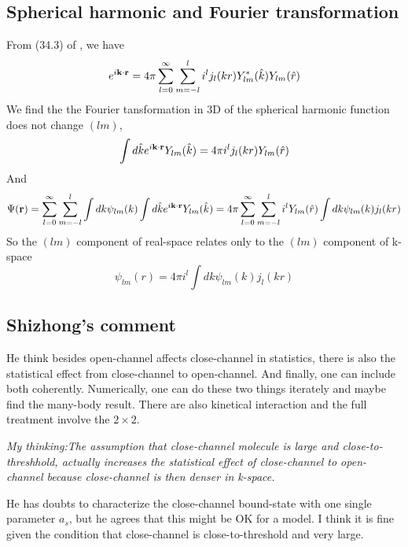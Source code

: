 \subsection{Spherical harmonic and Fourier transformation}
From (34.3) of \cite{landau}, we have
\begin{equation}
e^{i\mathbf{k}\cdot\mathbf{r}}=4\pi\sum_{l=0}^{\infty}\sum_{m=-l}^{l}i^l{}j_l(kr)Y^*_{lm}(\hat{k})Y_{lm}(\hat{r})
\end{equation}
We find the the Fourier tansformation in 3D of the spherical harmonic function does not change $(lm)$,
\begin{equation}
\int{d\hat{k}e^{i\ensuremath{\mathbf{k}}\cdot\ensuremath{\mathbf{r}}}Y_{lm}(\hat{k})}=4\pi{}i^l{}j_l(kr)Y_{lm}(\hat{r})
\end{equation} 
And 
\begin{equation*}
\Psi(\mathbf{r})=\sum_{l=0}^{\infty}\sum_{m=-l}^{l}\int{dk}\psi_{lm}{(k)}\int{d\hat{k}e^{i\ensuremath{\mathbf{k}}\cdot\ensuremath{\mathbf{r}}}Y_{lm}(\hat{k})}=4\pi{}\sum_{l=0}^{\infty}\sum_{m=-l}^{l}i^l{}Y_{lm}(\hat{r})\int{dk}\psi_{lm}{(k)}j_l(kr)
\end{equation*}
So the $(lm)$ component of real-space relates only to the $(lm)$ component of k-space 
\begin{equation}
\psi_{lm}(r)=4\pi{}i^l{}\int{dk}\psi_{lm}{(k)}j_l(kr)
\end{equation}


\subsection{Shizhong's comment\label{subsec:20091207}}
He think besides open-channel affects close-channel in statistics, there is also the statistical effect from close-channel to open-channel.  And finally, one can include both coherently. Numerically, one can do these two things iterately and maybe find the many-body result. There are also kinetical interaction and the full treatment involve the $2\times2$.   

\textit{My thinking:The assumption that close-channel molecule is large and close-to-threshhold, actually increases the statistical effect of close-channel to open-channel because close-channel is then denser in k-space.  	}

He has doubts to characterize the close-channel bound-state with one single parameter $a_s$, but he agrees that this might be OK for a model.  I think it is fine given the condition that close-channel is close-to-threshold and very large.  
